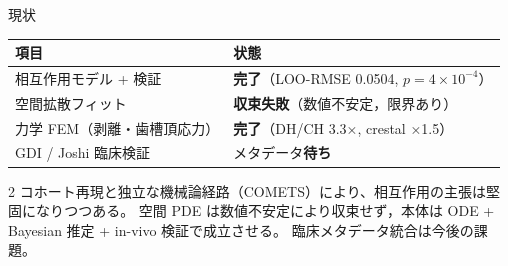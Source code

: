 \documentclass[
  ignorenonframetext,
  aspectratio=169,
]{beamer}
\begin{document}
\begin{frame}{現状}
\protect\hypertarget{ux73feux72b6}{}
\begin{longtable}[]{@{}ll@{}}
\toprule
項目 & 状態 \\
\midrule
\endhead
相互作用モデル + 検証 & \textbf{完了}（LOO-RMSE 0.0504,
\(p=4\times10^{-4}\)） \\
空間拡散フィット & \textbf{収束失敗}（数値不安定，限界あり） \\
力学 FEM（剥離・歯槽頂応力） & \textbf{完了}（DH/CH 3.3×, crestal
×1.5） \\
GDI / Joshi 臨床検証 & メタデータ\textbf{待ち} \\
\bottomrule
\end{longtable}

\vspace{0.3em}

2
コホート再現と独立な機械論経路（COMETS）により、相互作用の主張は堅固になりつつある。
空間 PDE は数値不安定により収束せず，本体は ODE + Bayesian 推定 + in-vivo 検証で成立させる。
臨床メタデータ統合は今後の課題。
\end{frame}
\end{document}
